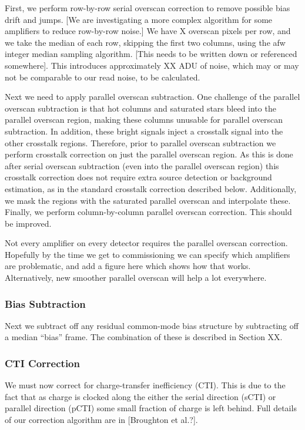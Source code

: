 \documentclass[SE,authoryear,lsstdraft,toc]{lsstdoc}
\begin{document}
First, we perform row-by-row serial overscan correction to remove possible bias
drift and jumps.  [We are investigating a more complex algorithm for some amplifiers
to reduce row-by-row noise.]  We have X overscan pixels per row, and we take
the median of each row, skipping the first two columns, using the afw integer
median sampling algorithm.  [This needs to be written down or referenced
  somewhere].  This introduces approximately XX ADU of noise, which may or may
not be comparable to our read noise, to be calculated.

Next we need to apply parallel overscan subtraction.  One challenge of the
parallel overscan subtraction is that hot columns and saturated stars bleed
into the parallel overscan region, making these columns unusable for
parallel overscan subtraction.  In addition, these bright signals inject a
crosstalk signal into the other crosstalk regions.  Therefore, prior to
parallel overscan subtraction we perform crosstalk correction on just the
parallel overscan region.  As this is done after serial overscan subtraction
(even into the parallel overscan region) this crosstalk correction does not
require extra source detection or background estimation, as in the standard
crosstalk correction described below.  Additionally, we mask the regions with
the saturated parallel overscan and interpolate these.  Finally, we perform
column-by-column parallel overscan correction.  This should be improved.

Not every amplifier on every detector requires the parallel overscan
correction.  Hopefully by the time we get to commissioning we can specify which
amplifiers are problematic, and add a figure here which shows how that works.
Alternatively, new smoother parallel overscan will help a lot everywhere.

\subsubsection{Bias Subtraction}

Next we subtract off any residual common-mode bias structure by subtracting off
a median ``bias'' frame.  The combination of these is described in Section XX.

\subsubsection{CTI Correction}

We must now correct for charge-transfer inefficiency (CTI).  This is due to the
fact that as charge is clocked along the either the serial direction (sCTI) or
parallel direction (pCTI) some small fraction of charge is left behind.  Full
details of our correction algorithm are in [Broughton et al.?].
\end{document}
